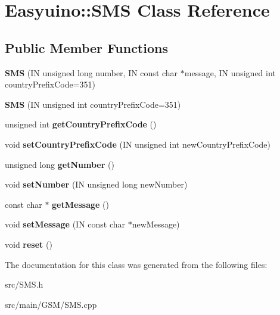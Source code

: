 \hypertarget{class_easyuino_1_1_s_m_s}{}\section{Easyuino\+:\+:S\+MS Class Reference}
\label{class_easyuino_1_1_s_m_s}
\subsection*{Public Member Functions}
\begin{DoxyCompactItemize}
\item 
\mbox{\label{class_easyuino_1_1_s_m_s_a5c56de204df53688169644314e8f0efe}} 
{\bfseries S\+MS} (IN unsigned long number, IN const char $\ast$message, IN unsigned int country\+Prefix\+Code=351)
\item 
\mbox{\label{class_easyuino_1_1_s_m_s_a9088a459857f18c463d3ad198bbe0abd}} 
{\bfseries S\+MS} (IN unsigned int country\+Prefix\+Code=351)
\item 
\mbox{\label{class_easyuino_1_1_s_m_s_aef79317e0ee7511d85814a10aaa15e14}} 
unsigned int {\bfseries get\+Country\+Prefix\+Code} ()
\item 
\mbox{\label{class_easyuino_1_1_s_m_s_a05650de23138fee2dfc1ce9a8e2b0429}} 
void {\bfseries set\+Country\+Prefix\+Code} (IN unsigned int new\+Country\+Prefix\+Code)
\item 
\mbox{\label{class_easyuino_1_1_s_m_s_ab46be8f783d59208245e9d14d3a046d5}} 
unsigned long {\bfseries get\+Number} ()
\item 
\mbox{\label{class_easyuino_1_1_s_m_s_a6d9b21c6480b7e859dfb16688090ed1c}} 
void {\bfseries set\+Number} (IN unsigned long new\+Number)
\item 
\mbox{\label{class_easyuino_1_1_s_m_s_a4dd59f4867dd2ae10a3eaf63ab3c234b}} 
const char $\ast$ {\bfseries get\+Message} ()
\item 
\mbox{\label{class_easyuino_1_1_s_m_s_a7c0fdcb9b1a54cf025c6b98618badc21}} 
void {\bfseries set\+Message} (IN const char $\ast$new\+Message)
\item 
\mbox{\label{class_easyuino_1_1_s_m_s_a0f4b83fa7be59e7efa85c4d8e36ec8e3}} 
void {\bfseries reset} ()
\end{DoxyCompactItemize}


The documentation for this class was generated from the following files\+:\begin{DoxyCompactItemize}
\item 
src/S\+M\+S.\+h\item 
src/main/\+G\+S\+M/S\+M\+S.\+cpp\end{DoxyCompactItemize}
